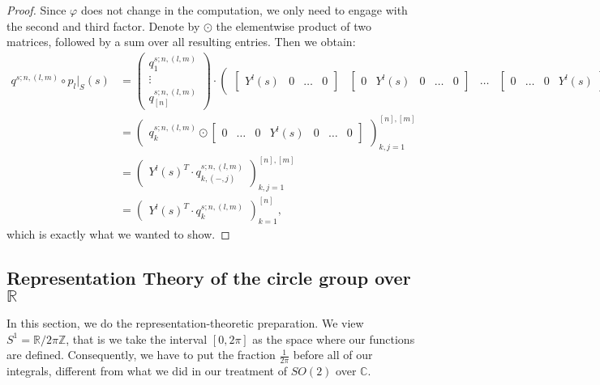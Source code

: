 \documentclass[12pt, a4paper]{article}
\theoremstyle{plain}
\theoremstyle{definition}
\theoremstyle{remark}
\newcommand{\Z}{\mathds{Z}}
\newcommand{\R}{\mathds{R}}
\newcommand{\C}{\mathds{C}}
\begin{document}
\begin{proof}
Since $\varphi$ does not change in the computation, we only need to engage with the second and third factor. Denote by $\odot$ the elementwise product of two matrices, followed by a sum over all resulting entries. Then we obtain:
\begin{align*}
q^{s;n,(l,m)} \circ p_l|_S(s) & = 
\begin{pmatrix}
q^{s;n,(l,m)}_1 \\
\vdots \\
q^{s;n,(l,m)}_{[n]}
\end{pmatrix} \cdot  \begin{pmatrix}
\begin{bmatrix}
Y^l(s) & 0 & \hdots & 0
\end{bmatrix}
&
\begin{bmatrix}
0 & Y^l(s) & 0 & \hdots & 0
\end{bmatrix}
&
\hdots
&
\begin{bmatrix}
0 & \hdots & 0 & Y^l(s)
\end{bmatrix}
\end{pmatrix}\\
& = 
\begin{pmatrix}
q^{s;n,(l,m)}_{k} \odot \begin{bmatrix}0 & \hdots & 0 & Y^l(s) & 0 & \hdots & 0 \end{bmatrix}
\end{pmatrix}_{k, j = 1}^{[n], [m]} \\
& = \begin{pmatrix}
Y^l(s)^T \cdot q^{s;n,(l,m)}_{k, (-,j)}
\end{pmatrix}_{k, j = 1}^{[n], [m]} \\
& = \begin{pmatrix}
Y^l(s)^T \cdot q^{s;n,(l,m)}_{k}
\end{pmatrix}_{k=1}^{[n]},
\end{align*}
which is exactly what we wanted to show.
\end{proof}



\subsection{Representation Theory of the circle group over $\R$}

In this section, we do the representation-theoretic preparation. We view $S^1 = \R/{2 \pi \Z}$, that is we take the interval $[0, 2 \pi]$ as the space where our functions are defined. Consequently, we have to put the fraction $\frac{1}{2 \pi}$ before all of our integrals, different from what we did in our treatment of $SO(2)$ over $\C$.
\end{document}
